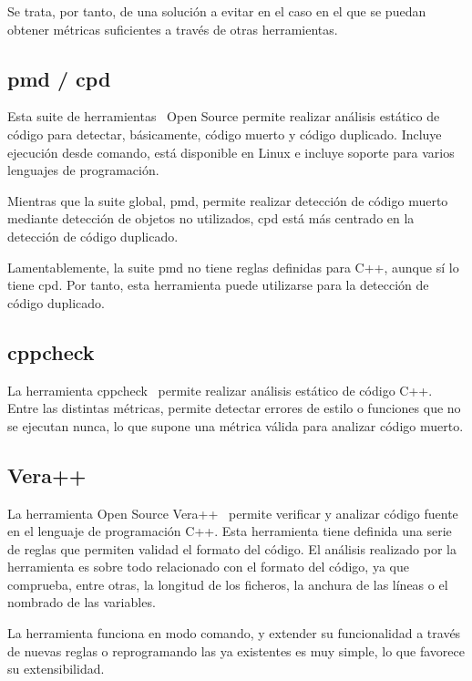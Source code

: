\documentclass[11pt]{article}
\begin{document}
Se trata, por tanto, de una solución a evitar en el caso en el que se puedan obtener métricas suficientes a través de otras herramientas.

\subsection{pmd / cpd}

Esta suite de herramientas~\cite{metrictools:pmdcpd} Open Source permite realizar análisis estático de código para detectar, básicamente, código muerto y código duplicado. Incluye ejecución desde comando, está disponible en Linux e incluye soporte para varios lenguajes de programación.

Mientras que la suite global, pmd, permite realizar detección de código muerto mediante detección de objetos no utilizados, cpd está más centrado en la detección de código duplicado.

Lamentablemente, la suite pmd no tiene reglas definidas para C++, aunque sí lo tiene cpd. Por tanto, esta herramienta puede utilizarse para la detección de código duplicado.

\subsection{cppcheck}

La herramienta cppcheck~\cite{metrictools:cppcheck} permite realizar análisis estático de código C++. Entre las distintas métricas, permite detectar errores de estilo o funciones que no se ejecutan nunca, lo que supone una métrica válida para analizar código muerto.

\subsection{Vera++}

La herramienta Open Source Vera++~\cite{metrictools:veraplusplus} permite verificar y analizar código fuente en el lenguaje de programación C++. Esta herramienta tiene definida una serie de reglas que permiten validad el formato del código. El análisis realizado por la herramienta es sobre todo relacionado con el formato del código, ya que comprueba, entre otras, la longitud de los ficheros, la anchura de las líneas o el nombrado de las variables.

La herramienta funciona en modo comando, y extender su funcionalidad a través de nuevas reglas o reprogramando las ya existentes es muy simple, lo que favorece su extensibilidad.
\end{document}
